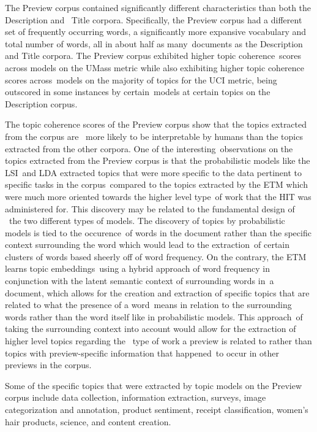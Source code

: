 \documentclass[letterpaper,12pt]{article}
\begin{document}
The Preview corpus contained significantly different characteristics than both the Description and \
Title corpora. Specifically, the Preview corpus had a different set of frequently occurring words,
a significantly more expansive vocabulary and total number of words, all in about half as many\
documents as the Description and Title corpora. The Preview corpus exhibited higher topic coherence\
scores across models on the UMass metric while also exhibiting higher topic coherence scores across\
models on the majority of topics for the UCI metric, being outscored in some instances by certain\
models at certain topics on the Description corpus.

The topic coherence scores of the Preview corpus show that the topics extracted from the corpus are \
more likely to be interpretable by humans than the topics extracted from the other corpora. One of the interesting\
observations on the topics extracted from the Preview corpus is that the probabilistic models like the LSI\
and LDA extracted topics that were more specific to the data pertinent to specific tasks in the corpus\
compared to the topics extracted by the ETM which were much more oriented towards the higher level type\
of work that the HIT was administered for. This discovery may be related to the fundamental design of \
the two different types of models. The discovery of topics by probabilistic models is tied to the occurence\
of words in the document rather than the specific context surrounding the word which would lead to the extraction\
of certain clusters of words based sheerly off of word frequency. On the contrary, the ETM learns topic embeddings\
using a hybrid approach of word frequency in conjunction with the latent semantic context of surrounding words in\
a document, which allows for the creation and extraction of specific topics that are related to what the presence of a word\
means in relation to the surrounding words rather than the word itself like in probabilistic models. This approach\
of taking the surrounding context into account would allow for the extraction of higher level topics regarding the \
type of work a preview is related to rather than topics with preview-specific information that happened\
to occur in other previews in the corpus.

Some of the specific topics that were extracted by topic models on the Preview corpus include data collection,
information extraction, surveys, image categorization and annotation, product sentiment, receipt classification,
women's hair products, science, and content creation.
\end{document}
